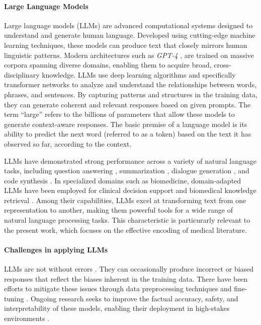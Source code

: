 \documentclass[10pt,leqno]{amsart}
\begin{document}
\paragraph{\textbf{Large Language Models}}
Large language models (LLMs) \cite{zhao2023survey} are advanced computational systems 
designed to understand and generate human language. 
Developed using cutting-edge machine learning techniques, 
these models can produce text that closely mirrors human linguistic patterns.
Modern architectures such as \textit{GPT-4} \cite{openai2023gpt4}, 
are trained on massive corpora spanning diverse domains, 
enabling them to acquire broad, cross-disciplinary knowledge. 
LLMs use deep learning algorithms \cite{Sarker2021} 
and specifically transformer networks \cite{Dosovitskiy2020} 
to analyze and understand the relationships between words, phrases, and sentences. 
By capturing patterns and structures in the training data, 
they can generate coherent and relevant responses based on given prompts.
The term “large” refers to the billions of parameters 
that allow these models to generate context-aware responses. 
The basic premise of a language model is its ability to predict 
the next word (referred to as a token) based on the text it has observed so far, 
according to the context.


LLMs have demonstrated strong performance across a variety of natural language tasks, 
including question answering \cite{Brown2020}, summarization \cite{Zhang2020}, 
dialogue generation \cite{Thoppilan2022lamda}, and code synthesis \cite{Chen2021}. 
In specialized domains such as biomedicine, domain-adapted LLMs have been employed 
for clinical decision support \cite{Singhal2023} and 
biomedical knowledge retrieval \cite{Luo2022}.
Among their capabilities, LLMs excel at transforming text from one representation to another, 
making them powerful tools for a wide range of natural language processing tasks. 
This characteristic is particurarly relevant to the present work, 
which focuses on the effective encoding of medical literature. 

\paragraph{\textbf{Challenges in applying LLMs}}

LLMs are not without errors \cite{Raj2023, Ruis2023}. 
They can occasionally produce incorrect or biased responses 
that reflect the biases inherent in the training data. 
There have been efforts to mitigate these issues 
through data preprocessing techniques and fine-tuning \cite{Dodge2021}.
Ongoing research seeks to improve the factual accuracy, safety, and interpretability 
of these models, enabling their deployment in high-stakes environments \cite{Ganguli2022}.
\end{document}
